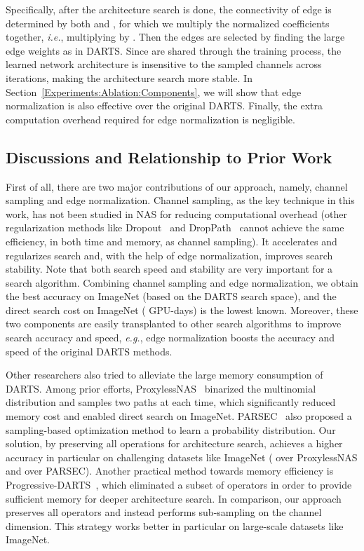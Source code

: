 \documentclass{article} \usepackage{iclr2020_conference,times}
\begin{document}
Specifically, after the architecture search is done, the connectivity of edge  is determined by both  and , for which we multiply the normalized coefficients together, \textit{i.e.}, multiplying  by . Then the edges are selected by finding the large edge weights as in DARTS. Since  are shared through the training process, the learned network architecture is insensitive to the sampled channels across iterations, making the architecture search more stable. 
In Section~\ref{Experiments:Ablation:Components}, we will show that edge normalization is also effective over the original DARTS. Finally, the extra computation overhead required for edge normalization is negligible.

\subsection{Discussions and Relationship to Prior Work}

First of all, there are two major contributions of our approach, namely, channel sampling and edge normalization. Channel sampling, as the key technique in this work, has not been studied in NAS for reducing computational overhead (other regularization methods like Dropout~\citep{srivastava2014dropout} and DropPath~\citep{larsson2016fractalnet} cannot achieve the same efficiency, in both time and memory, as channel sampling). It accelerates and regularizes search and, with the help of edge normalization, improves search stability. Note that both search speed and stability are very important for a search algorithm. Combining channel sampling and edge normalization, we obtain the best accuracy on ImageNet (based on the DARTS search space), and the direct search cost on ImageNet ( GPU-days) is the lowest known. Moreover, these two components are easily transplanted to other search algorithms to improve search accuracy and speed, \textit{e.g.}, edge normalization boosts the accuracy and speed of the original DARTS methods.

Other researchers also tried to alleviate the large memory consumption of DARTS. Among prior efforts, ProxylessNAS~\citep{cai2018proxylessnas} binarized the multinomial distribution  and samples two paths at each time, which significantly reduced memory cost and enabled direct search on ImageNet. PARSEC~\citep{casale2019probabilistic} also proposed a sampling-based optimization method to learn a probability distribution. Our solution, by preserving all operations for architecture search, achieves a higher accuracy in particular on challenging datasets like ImageNet ( over ProxylessNAS and  over PARSEC). Another practical method towards memory efficiency is Progressive-DARTS~\citep{chen2019progressive}, which eliminated a subset of operators in order to provide sufficient memory for deeper architecture search. In comparison, our approach preserves all operators and instead performs sub-sampling on the channel dimension. This strategy works better in particular on large-scale datasets like ImageNet.
\end{document}
